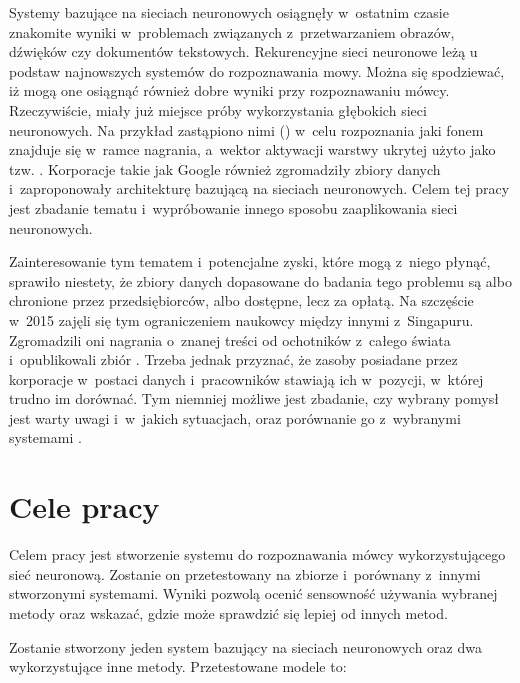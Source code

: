 Systemy bazujące na sieciach neuronowych osiągnęły w~ostatnim czasie znakomite wyniki w~problemach
związanych z~przetwarzaniem obrazów, dźwięków czy dokumentów tekstowych. Rekurencyjne sieci neuronowe
leżą u podstaw najnowszych systemów do rozpoznawania mowy. Można się spodziewać, iż mogą one
osiągnąć również dobre wyniki przy rozpoznawaniu mówcy. Rzeczywiście, miały już miejsce próby
wykorzystania głębokich sieci neuronowych. Na przykład zastąpiono nimi
 () w~celu rozpoznania
jaki fonem znajduje się w~ramce nagrania, a~wektor aktywacji warstwy ukrytej użyto jako tzw.
\cite{investigationOfBottleneck}.
Korporacje takie jak Google również zgromadziły zbiory danych i~zaproponowały architekturę bazującą na sieciach
neuronowych\cite{endToEnd}. Celem tej pracy jest zbadanie tematu i~wypróbowanie innego sposobu zaaplikowania
sieci neuronowych.

Zainteresowanie tym tematem i~potencjalne zyski, które mogą z~niego płynąć, sprawiło niestety,
że zbiory danych dopasowane do badania tego problemu są albo chronione przez przedsiębiorców,
albo dostępne, lecz za opłatą. Na szczęście w~2015 zajęli się tym ograniczeniem naukowcy
między innymi z~Singapuru. Zgromadzili oni nagrania o~znanej
treści od ochotników z~całego świata i~opublikowali zbiór . Trzeba jednak przyznać, że
zasoby posiadane przez korporacje w~postaci danych i~pracowników stawiają ich
w~pozycji, w~której trudno im dorównać. Tym niemniej możliwe jest zbadanie, czy wybrany pomysł
jest warty uwagi i~w~jakich sytuacjach, oraz porównanie go z~wybranymi systemami .

\section{Cele pracy}\label{sec:cele_pracy}

Celem pracy jest stworzenie systemu do rozpoznawania mówcy wykorzystującego sieć neuronową.
Zostanie on przetestowany na zbiorze  i~porównany z~innymi stworzonymi systemami.
Wyniki pozwolą ocenić sensowność używania wybranej metody oraz wskazać, gdzie może sprawdzić się lepiej
od innych metod.

Zostanie stworzony jeden system bazujący na sieciach neuronowych oraz dwa wykorzystujące inne metody. Przetestowane
modele to:

